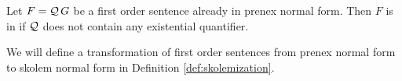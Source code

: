 \begin{definition}\label{def:skolem:normal:form}
	Let \( F = \mathcal{Q}\,G \) be a first order sentence
	already in prenex normal form.
	Then \( F \) 
	is in 
	if \( \mathcal{Q} \) does not contain any existential quantifier.
\end{definition}

We will define a transformation of first order sentences 
from prenex normal form
to skolem normal form 
in Definition \vref{def:skolemization}.


